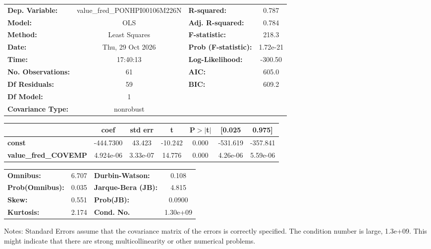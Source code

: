 \begin{center}
\begin{tabular}{lclc}
\toprule
\textbf{Dep. Variable:}      & value\_fred\_PONHPI00106M226N & \textbf{  R-squared:         } &     0.787   \\
\textbf{Model:}              &              OLS              & \textbf{  Adj. R-squared:    } &     0.784   \\
\textbf{Method:}             &         Least Squares         & \textbf{  F-statistic:       } &     218.3   \\
\textbf{Date:}               &        Thu, 29 Oct 2026       & \textbf{  Prob (F-statistic):} &  1.72e-21   \\
\textbf{Time:}               &            17:40:13           & \textbf{  Log-Likelihood:    } &   -300.50   \\
\textbf{No. Observations:}   &                 61            & \textbf{  AIC:               } &     605.0   \\
\textbf{Df Residuals:}       &                 59            & \textbf{  BIC:               } &     609.2   \\
\textbf{Df Model:}           &                  1            & \textbf{                     } &             \\
\textbf{Covariance Type:}    &           nonrobust           & \textbf{                     } &             \\
\bottomrule
\end{tabular}
\begin{tabular}{lcccccc}
                             & \textbf{coef} & \textbf{std err} & \textbf{t} & \textbf{P$> |$t$|$} & \textbf{[0.025} & \textbf{0.975]}  \\
\midrule
\textbf{const}               &    -444.7300  &       43.423     &   -10.242  &         0.000        &     -531.619    &     -357.841     \\
\textbf{value\_fred\_COVEMP} &    4.924e-06  &     3.33e-07     &    14.776  &         0.000        &     4.26e-06    &     5.59e-06     \\
\bottomrule
\end{tabular}
\begin{tabular}{lclc}
\textbf{Omnibus:}       &  6.707 & \textbf{  Durbin-Watson:     } &    0.108  \\
\textbf{Prob(Omnibus):} &  0.035 & \textbf{  Jarque-Bera (JB):  } &    4.815  \\
\textbf{Skew:}          &  0.551 & \textbf{  Prob(JB):          } &   0.0900  \\
\textbf{Kurtosis:}      &  2.174 & \textbf{  Cond. No.          } & 1.30e+09  \\
\bottomrule
\end{tabular}
\end{center}

Notes: \newline
 [1] Standard Errors assume that the covariance matrix of the errors is correctly specified. \newline
 [2] The condition number is large, 1.3e+09. This might indicate that there are \newline
 strong multicollinearity or other numerical problems.